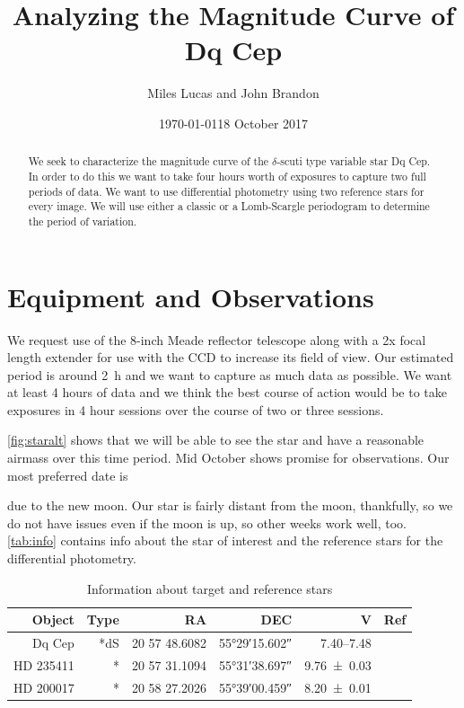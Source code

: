\documentclass[]{article}
\title{Analyzing the Magnitude Curve of Dq Cep}
\author{Miles Lucas and John Brandon}
\date{\today}
\begin{document}
\maketitle


\begin{abstract}
	We seek to characterize the magnitude curve of the $\delta$-scuti type variable star Dq Cep. In order to do this we want to take four hours worth of exposures to capture two full periods of data. We want to use differential photometry using two reference stars for every image. We will use either a classic or a Lomb-Scargle periodogram to determine the period of variation.
\end{abstract}

\section{Equipment and Observations}
	We request use of the 8-inch Meade reflector telescope along with a 2x focal length extender for use with the CCD to increase its field of view. Our estimated period is around \SI{2}{\hour} and we want to capture as much data as possible. We want at least 4 hours of data and we think the best course of action would be to take exposures in 4 hour sessions over the course of two or three sessions. 
	
	\autoref{fig:staralt} shows that we will be able to see the star and have a reasonable airmass over this time period. Mid October shows promise for observations. Our most preferred date is \date{18 October 2017} due to the new moon. Our star is fairly distant from the moon, thankfully, so we do not have issues even if the moon is up, so other weeks work well, too. \autoref{tab:info} contains info about the star of interest and the reference stars for the differential photometry.
	\begin{table}[]
		\centering
		\caption{Information about target and reference stars}
		\begin{tabular}{rrrrrr}
			\hline
			Object & Type &            RA &                DEC &                      V &                        Ref \\ \hline\hline
			Dq Cep &  *dS & 20 57 48.6082 & \ang{55;29;15.602} & \SIrange{7.40}{7.48}{} & \autocite{1971GCVS3.C......0K} \\
			HD 235411 &    * & 20 57 31.1094 & \ang{55;31;38.697} &     \SI{9.76\pm0.03}{} &  \autocite{2000AA...355L..27H} \\
			HD 200017 &    * & 20 58 27.2026 & \ang{55;39;00.459} &     \SI{8.20\pm0.01}{} &  \autocite{2000AA...355L..27H} \\ \hline
		\end{tabular}
		\label{tab:info}
	\end{table}
\end{document}
